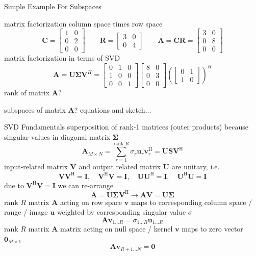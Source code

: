 \documentclass[mathserif, aspectratio=1610]{intbeamer}
\begin{document}
\begin{frame}[t]{Simple Example For Subspaces}

matrix factorization column space times row space
$$
\bm{C} =
\begin{bmatrix}
1 & 0 \\ 0 & 2 \\ 0 & 0
\end{bmatrix}
\qquad
\bm{R} =
\begin{bmatrix}
3 & 0 \\ 0 & 4
\end{bmatrix}
\qquad
\bm{A} =
\bm{C} \bm{R} =
\begin{bmatrix}
3 & 0 \\ 0 & 8 \\ 0 & 0
\end{bmatrix}
$$
matrix factorization in terms of SVD
$$
\bm{A} = \bm{U} \bm{\Sigma} \bm{V}^H
=
\begin{bmatrix}
0 & 1 & 0 \\
1 & 0 & 0 \\
0 & 0 & 1
\end{bmatrix}
%
\begin{bmatrix}
8 & 0\\
0 & 3\\
0 & 0
\end{bmatrix}
%
\left(
\begin{bmatrix}
0 & 1\\
1 & 0
\end{bmatrix}
\right)^H
$$
rank of matrix $\bm{A}$?

subspaces of matrix $\bm{A}$? equations and sketch...

\end{frame}




\begin{frame}{SVD Fundamentals}
%
superposition of rank-1 matrices (outer products) because singular values in diagonal matrix $\bm{\Sigma}$
$$\bm{A}_{M \times N} = \sum_{r=1}^{\text{rank }R} \sigma_r \bm{u}_r \bm{v}_r^\mathrm{H} = \bm{U} \bm{S} \bm{V}^\mathrm{H}$$
%
input-related matrix $\bm{V}$ and output related matrix $\bm{U}$ are unitary, i.e.
$$\bm{V}\bm{V}^\mathrm{H}=\bm{I},\quad\bm{V}^\mathrm{H}\bm{V}=\bm{I},\quad\bm{U}\bm{U}^\mathrm{H}=\bm{I},\quad\bm{U}^\mathrm{H}\bm{U}=\bm{I}$$
%
due to $\bm{V}^\mathrm{H}\bm{V}=\bm{I}$ we can re-arrange
$$\bm{A} = \bm{U} \bm{\Sigma} \bm{V}^\mathrm{H} \rightarrow
\bm{A} \bm{V} = \bm{U} \bm{\Sigma}$$
rank $R$ matrix $\bm{A}$ acting on \textcolor{C2}{row space} $\bm{v}$ maps to corresponding \textcolor{C0}{column space / range / image} $\bm{u}$ weighted by corresponding singular value $\sigma$
$$\bm{A} \bm{v}_{1...R} = \sigma_{1...R} \bm{u}_{1...R}$$
rank $R$ matrix $\bm{A}$ matrix acting on \textcolor{C1}{null space / kernel} $\bm{v}$ maps to zero vector $\bm{0}_{M \times 1}$
$$\bm{A} \bm{v}_{R+1...N} = \bm{0}$$


\end{frame}
\end{document}

